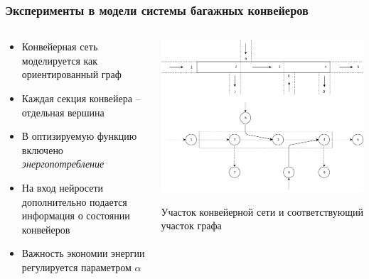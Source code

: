 \documentclass{beamer}
\begin{document}

\begin{frame}
  \frametitle{Эксперименты в модели системы багажных конвейеров}
  \begin{columns}
    \begin{column}{0.5\textwidth} 
      \begin{itemize}
      \item Конвейерная сеть моделируется как ориентированный граф
      \item Каждая секция конвейера -- отдельная вершина
      \item В оптизируемую функцию включено \textit{энергопотребление}
      \item На вход нейросети дополнительно подается информация о состоянии конвейеров
      \item Важность экономии энергии регулируется параметром $\alpha$
      \end{itemize}
    \end{column}
    \begin{column}{0.5\textwidth}
      \includegraphics[width=\textwidth]{belt-illustration}  

      Участок конвейерной сети и соответствующий участок графа
    \end{column}
  \end{columns}
\end{frame}

\end{document}
